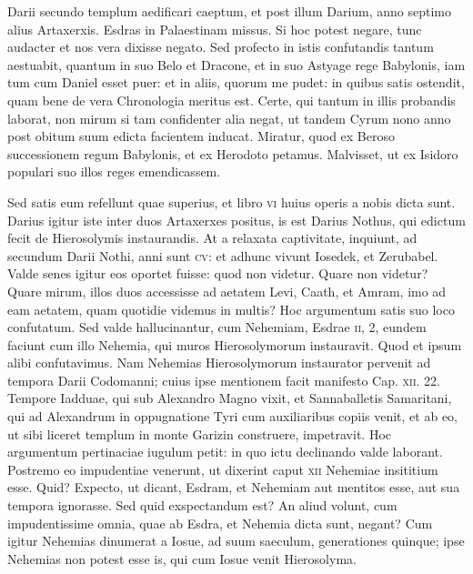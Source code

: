 Darii secundo templum aedificari caeptum, et post illum Darium,
anno septimo alius Artaxerxis.
Esdras in Palaestinam missus.
Si hoc potest negare, tunc audacter et nos vera dixisse negato.
Sed profecto
in istis confutandis tantum aestuabit, quantum in suo Belo et
Dracone, et in suo Astyage rege Babylonis, iam tum cum Daniel
esset puer: et in aliis, quorum me pudet: in quibus satis ostendit,
quam bene de vera Chronologia meritus est.
Certe, qui tantum in
illis probandis laborat, non mirum si tam confidenter alia negat, ut
tandem Cyrum nono anno post obitum suum edicta facientem inducat.
Miratur, quod ex Beroso successionem regum Babylonis, et
ex Herodoto petamus. Malvisset, ut ex Isidoro populari suo illos
reges emendicassem.

Sed satis eum refellunt quae superius, et libro
\textsc{vi} huius operis a nobis dicta sunt.
Darius igitur iste inter duos Artaxerxes
positus, is est Darius Nothus, qui edictum fecit de Hierosolymis
instaurandis.
At a relaxata captivitate, inquiunt, ad secundum
Darii Nothi, anni sunt \textsc{cv}: et adhunc vivunt Iosedek, et Zerubabel.
Valde senes igitur eos oportet fuisse: quod non videtur.
Quare non videtur?
Quare mirum, illos duos accessisse ad aetatem
Levi, Caath, et Amram, imo ad eam aetatem, quam quotidie videmus
in multis?
Hoc argumentum satis suo loco confutatum.
Sed
valde hallucinantur, cum Nehemiam, Esdrae \textsc{ii}, 2, eundem faciunt
cum illo Nehemia, qui muros Hierosolymorum instauravit.
Quod et ipsum alibi confutavimus.
Nam Nehemias Hierosolymorum
instaurator pervenit ad tempora Darii Codomanni;
cuius ipse mentionem facit manifesto Cap. \textsc{xii}. 22.
Tempore Iadduae,
qui sub Alexandro Magno vixit, et Sannaballetis Samaritani,
qui ad Alexandrum in oppugnatione Tyri cum auxiliaribus
copiis venit, et ab eo, ut sibi liceret templum in monte Garizin
construere, impetravit.
Hoc argumentum pertinaciae iugulum
petit: in quo ictu declinando valde laborant.
Postremo
eo impudentiae venerunt, ut dixerint caput \textsc{xii} Nehemiae insititium
esse.
Quid?
Expecto, ut dicant, Esdram, et Nehemiam aut
mentitos esse, aut sua tempora ignorasse.
Sed quid exspectandum
est?
An aliud volunt, cum impudentissime omnia, quae ab Esdra,
et Nehemia dicta sunt, negant?
Cum igitur Nehemias dinumerat
a Iosue, ad suum saeculum, generationes quinque; ipse
Nehemias non potest esse is, qui cum Iosue venit Hierosolyma.
